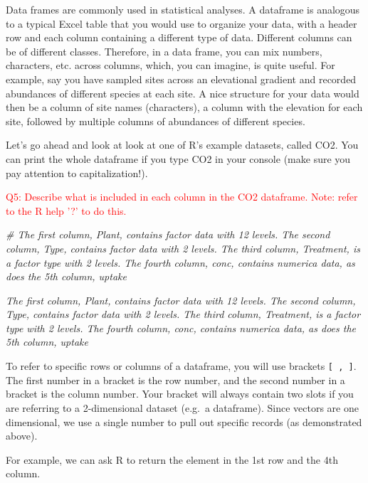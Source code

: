 \documentclass[]{article}
\newenvironment{Shaded}{\begin{snugshade}}{\end{snugshade}}
\newcommand{\CommentTok}[1]{\textcolor[rgb]{0.56,0.35,0.01}{\textit{#1}}}
\begin{document}
Data frames are commonly used in statistical analyses. A dataframe is
analogous to a typical Excel table that you would use to organize your
data, with a header row and each column containing a different type of
data. Different columns can be of different classes. Therefore, in a
data frame, you can mix numbers, characters, etc. across columns, which,
you can imagine, is quite useful. For example, say you have sampled
sites across an elevational gradient and recorded abundances of
different species at each site. A nice structure for your data would
then be a column of site names (characters), a column with the elevation
for each site, followed by multiple columns of abundances of different
species.

Let's go ahead and look at look at one of R's example datasets, called
CO2. You can print the whole dataframe if you type CO2 in your console
(make sure you pay attention to capitalization!).

\textcolor{red}{Q5: Describe what is included in each column in the CO2 dataframe. Note: refer to the R help '?' to do this.}

\begin{Shaded}
\begin{Highlighting}[]
\CommentTok{# The first column, Plant, contains factor data with 12 levels. The second column, Type, contains factor data with 2 levels. The third column, Treatment, is a factor type with 2 levels. The fourth column, conc, contains numerica data, as does the 5th column, uptake}
\end{Highlighting}
\end{Shaded}

\emph{The first column, Plant, contains factor data with 12 levels. The
second column, Type, contains factor data with 2 levels. The third
column, Treatment, is a factor type with 2 levels. The fourth column,
conc, contains numerica data, as does the 5th column, uptake}

To refer to specific rows or columns of a dataframe, you will use
brackets \texttt{{[}\ ,\ {]}}. The first number in a bracket is the row
number, and the second number in a bracket is the column number. Your
bracket will always contain two slots if you are referring to a
2-dimensional dataset (e.g.~a dataframe). Since vectors are one
dimensional, we use a single number to pull out specific records (as
demonstrated above).

For example, we can ask R to return the element in the 1st row and the
4th column.
\end{document}
